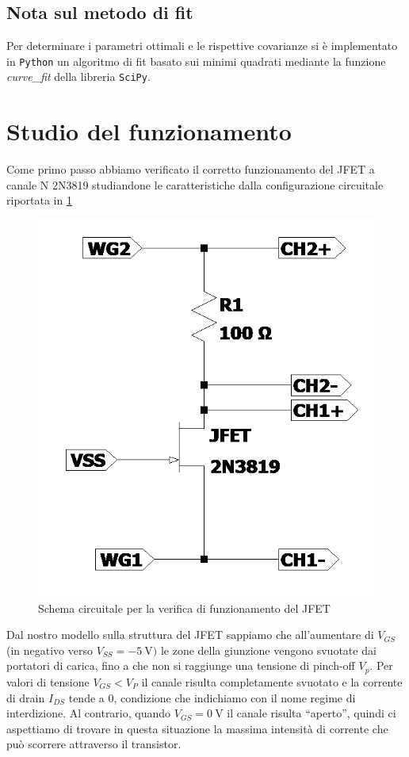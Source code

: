 \documentclass[10pt, a4paper, italian]{article}
\begin{document}
\subsection*{Nota sul metodo di fit}
Per determinare i parametri ottimali e le rispettive covarianze si \`e
implementato in \verb+Python+ un algoritmo di fit basato sui minimi quadrati
mediante la funzione \emph{curve\_fit} della libreria \texttt{SciPy}.

\section{Studio del funzionamento}
Come primo passo abbiamo verificato il corretto funzionamento del JFET a canale
N 2N3819 studiandone le caratteristiche dalla configurazione circuitale
riportata in \ref{schm: tracer}
\begin{figure}[htbp]
    \centering
	\includegraphics[scale=0.5]{Draft1}
    \caption{Schema circuitale per la verifica di funzionamento del JFET
    \label{schm: tracer}}
\end{figure}

Dal nostro modello sulla struttura del JFET sappiamo che all'aumentare di
$V_{GS}$ (in negativo verso $V_{SS} = \SI{-5}{\V})$ le zone della giunzione
vengono svuotate dai portatori di carica, fino a che non si raggiunge una
tensione di pinch-off $V_p$. Per valori di tensione $V_{GS} < V_P$ il canale
risulta completamente svuotato e la corrente di drain $I_{DS}$ tende a 0,
condizione che indichiamo con il nome regime di interdizione.
Al contrario, quando $V_{GS} = \SI{0}{\V}$ il canale risulta ``aperto'', quindi
ci aspettiamo di trovare in questa situazione la massima intensità di corrente
che può scorrere attraverso il transistor.
\end{document}
